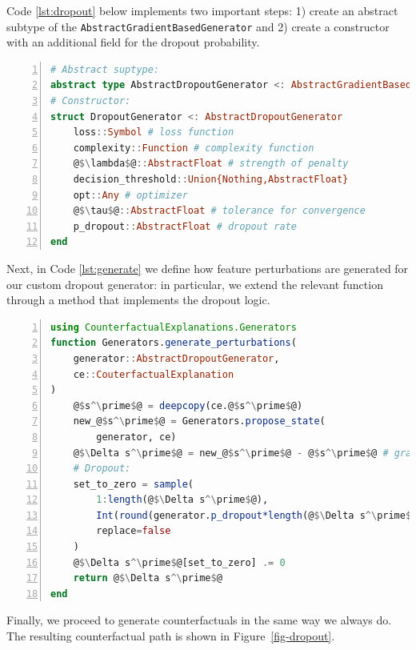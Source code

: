 \documentclass{juliacon}
\begin{document}
Code \ref{lst:dropout} below implements two important steps: 1) create
an abstract subtype of the \texttt{AbstractGradientBasedGenerator} and
2) create a constructor with an additional field for the dropout
probability.

\begin{lstlisting}[language=Julia, escapechar=@, numbers=left, label={lst:dropout}, caption={Building a custom generator with dropout.}]
# Abstract suptype:
abstract type AbstractDropoutGenerator <: AbstractGradientBasedGenerator end
# Constructor:
struct DropoutGenerator <: AbstractDropoutGenerator
    loss::Symbol # loss function
    complexity::Function # complexity function
    @$\lambda$@::AbstractFloat # strength of penalty
    decision_threshold::Union{Nothing,AbstractFloat} 
    opt::Any # optimizer
    @$\tau$@::AbstractFloat # tolerance for convergence
    p_dropout::AbstractFloat # dropout rate
end
\end{lstlisting}

Next, in Code \ref{lst:generate} we define how feature perturbations are
generated for our custom dropout generator: in particular, we extend the
relevant function through a method that implements the dropout logic.

\begin{lstlisting}[language=Julia, escapechar=@, numbers=left, label={lst:generate}, caption={Generating feature perturbations with dropout.}]
using CounterfactualExplanations.Generators
function Generators.generate_perturbations(
    generator::AbstractDropoutGenerator, 
    ce::CouterfactualExplanation
)
    @$s^\prime$@ = deepcopy(ce.@$s^\prime$@)
    new_@$s^\prime$@ = Generators.propose_state(
        generator, ce)
    @$\Delta s^\prime$@ = new_@$s^\prime$@ - @$s^\prime$@ # gradient step
    # Dropout:
    set_to_zero = sample(
        1:length(@$\Delta s^\prime$@),
        Int(round(generator.p_dropout*length(@$\Delta s^\prime$@))),
        replace=false
    )
    @$\Delta s^\prime$@[set_to_zero] .= 0
    return @$\Delta s^\prime$@
end
\end{lstlisting}

Finally, we proceed to generate counterfactuals in the same way we
always do. The resulting counterfactual path is shown in
Figure~\ref{fig-dropout}.
\end{document}
